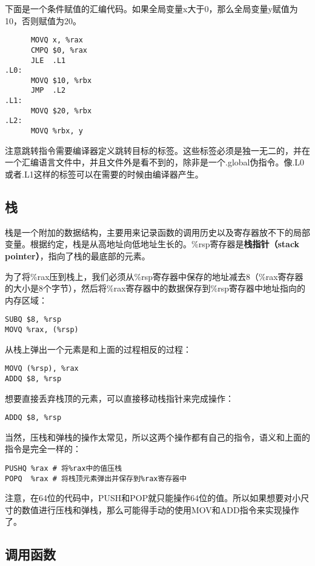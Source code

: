 \documentclass[cn,11pt,chinese]{elegantbook}
\begin{document}
下面是一个条件赋值的汇编代码。如果全局变量x大于0，那么全局变量y赋值为10，否则赋值为20。

\begin{verbatim}
      MOVQ x, %rax
      CMPQ $0, %rax
      JLE  .L1
.L0:
      MOVQ $10, %rbx
      JMP  .L2
.L1:
      MOVQ $20, %rbx
.L2:
      MOVQ %rbx, y
\end{verbatim}

注意跳转指令需要编译器定义跳转目标的标签。这些标签必须是独一无二的，并在一个汇编语言文件中，并且文件外是看不到的，除非是一个.global伪指令。像.L0或者.L1这样的标签可以在需要的时候由编译器产生。

\subsection{栈}

栈是一个附加的数据结构，主要用来记录函数的调用历史以及寄存器放不下的局部变量。根据约定，栈是从高地址向低地址生长的。\%rsp寄存器是\textbf{栈指针（stack pointer）}，指向了栈的最底部的元素。

为了将\%rax压到栈上，我们必须从\%rsp寄存器中保存的地址减去8（\%rax寄存器的大小是8个字节），然后将\%rax寄存器中的数据保存到\%rsp寄存器中地址指向的内存区域：

\begin{verbatim}
SUBQ $8, %rsp
MOVQ %rax, (%rsp)
\end{verbatim}

从栈上弹出一个元素是和上面的过程相反的过程：

\begin{verbatim}
MOVQ (%rsp), %rax
ADDQ $8, %rsp
\end{verbatim}

想要直接丢弃栈顶的元素，可以直接移动栈指针来完成操作：

\begin{verbatim}
ADDQ $8, %rsp
\end{verbatim}

当然，压栈和弹栈的操作太常见，所以这两个操作都有自己的指令，语义和上面的指令是完全一样的：

\begin{verbatim}
PUSHQ %rax # 将%rax中的值压栈
POPQ  %rax # 将栈顶元素弹出并保存到%rax寄存器中
\end{verbatim}

注意，在64位的代码中，PUSH和POP就只能操作64位的值。所以如果想要对小尺寸的数值进行压栈和弹栈，那么可能得手动的使用MOV和ADD指令来实现操作了。

\subsection{调用函数}
\end{document}
